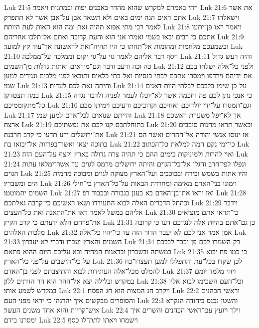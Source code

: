 Luk 21:5  ויהי באמרם למקדש שהוא מהדר באבנים יפות ובמתנות ויאמר׃
Luk 21:6  את אשר אתם ראים הנה ימים באים ולא תשאר אבן על־אבן אשר לא תתפרק׃
Luk 21:7  וישאלהו לאמר רבי מתי אפוא תהיה זאת ומה הוא האות לעת היותה׃
Luk 21:8  ויאמר ראו פן־יתעו אתכם כי רבים יבאו בשמי ואמרו אני הוא והעת קרובה ואתם אל־תלכו אחריהם׃
Luk 21:9  ובשמעכם מלחמות ומהומות אל־תחתו כי היו תהיה־זאת לראשונה אך־עוד קץ למועד׃
Luk 21:10  ויסף דבר אליהם לאמר גוי על־גוי יקום וממלכה על־ממלכה׃
Luk 21:11  והיה רעש גדול כה וכה ורעב ודבר וגם־מוראים ואתות גדלות מן־השמים׃
Luk 21:12  ולפני כל־אלה ישלחו בכם את־ידיהם וירדפו וימסרו אתכם לבתי כנסיות ואל־בתי כלאים ותובאו לפני מלכים ונגידים למען שמי׃
Luk 21:13  והיתה־זאת לכם לעדות׃
Luk 21:14  על־כן שימו בלבכם לבלתי היות דאגים במה תצטדקו׃
Luk 21:15  כי אנכי נתן לכם פה וחכמה אשר לא־יוכלו לעמד לפניה ולדבר נגדה כל־מתקוממיכם׃
Luk 21:16  וגם־תמסרו על־ידי יולדיכם ואחיכם וקרוביכם ורעיכם וימיתו מכם׃
Luk 21:17  והייתם שנואים לכל־אדם למען שמי׃
Luk 21:18  אך לא־יפל משערת ראשכם ארצה׃
Luk 21:19  בתוחלתכם קנו לכם את נפשתיכם׃
Luk 21:20  וכאשר תראו מחנות סובבים את־ירושלים ידע תדעו כי קרב חרבנה׃
Luk 21:21  אז ינוסו אנשי יהודה אל־ההרים ואשר הם בתוכה יצאו ואשר־בפרזות אל־יבואו בה׃
Luk 21:22  כי־ימי נקם המה למלאת כל־הכתוב׃
Luk 21:23  ואוי להרות ולמיניקות בימים ההם כי תהיה צרה גדולה בארץ וקצף על־העם הזה׃
Luk 21:24  ונפלו לפי־חרב והגלו אל־כל־הגוים והיתה ירושלים מרמס לגוים עד אשר־ימלאו עתות הגוים׃
Luk 21:25  והיו אתות בשמש ובירח ובכוכבים ועל־הארץ מצוקה לגוים ומבוכה מהמית הים ומשבריו׃
Luk 21:26  וימוגו בני־האדם מאימה ומחרדת הבאות על־כל־הארץ כי־חילי השמים יתמוטטו׃
Luk 21:27  ואז יראו את־בן־האדם בא בענן בגבורה ובכבוד רב׃
Luk 21:28  וכהחל הדברים האלה לבוא התעודדו ושאו ראשיכם כי־קרבה גאלתכם׃
Luk 21:29  וידבר אליהם במשל לאמר ראו את־התאנה ואת כל־העצים׃
Luk 21:30  כי־תראו אתם מוציאים את־פרחם הלא ידעתם כי קרב הקיץ׃
Luk 21:31  כן גם־אתם בהיות אלה לנגדכם דעו כי קרובה מלכות האלהים׃
Luk 21:32  אמן אמר אני לכם לא יעבר הדור הזה עד כי־יהיו כל־אלה׃
Luk 21:33  השמים והארץ יעברו ודברי לא יעברון׃
Luk 21:34  רק השמרו לכם פן־יכבד לבבכם במשתה ובשכרון ובדאגות המחיה ובא עליכם היום ההוא פתאם׃
Luk 21:35  כי כמו־פח יבוא על כל־הישבים על־פני כל־הארץ׃
Luk 21:36  לכן שקדו בכל־עת והתפללו למען תעצרו־כח להמלט מכל־אלה העתידות לבוא והתיצבתם לפני בן־האדם׃
Luk 21:37  ויהי מלמד יומם במקדש ובלילה יצא אל־ההר הוא הר הזיתים ללון׃
Luk 21:38  וכל־העם השכימו לבוא אליו במקדש לשמע אותו׃
Luk 22:1  ויקרב חג המצות הוא חג הפסח׃
Luk 22:2  וראשי הכהנים והסופרים מבקשים איך יהרגהו כי יראו מפני העם׃
Luk 22:3  והשטן נכנס ביהודה הנקרא איש־קריות והוא אחד משנים העשר׃
Luk 22:4  וילך ויועץ עם־ראשי הכהנים והשרים איך ימסרנו בידם׃
Luk 22:5  וישמחו ויאתו לתת־לו כסף׃
